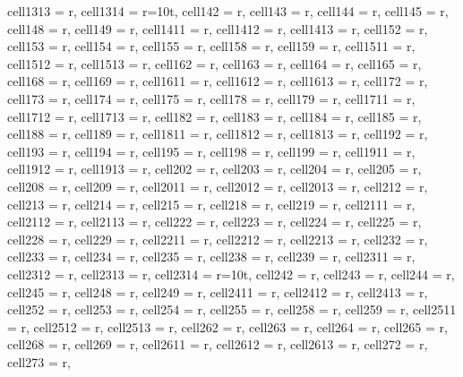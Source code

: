 \begin{landscape}
\begin{longtblr}[
  caption = {Changes in average values and effects differences significance from post hoc analysis.},
  label = {tab:appendix_LCBM_all_results_post_hocs}
]
{  cell{13}{13} = {r},
  cell{13}{14} = {r=10}{t},
  cell{14}{2} = {r},
  cell{14}{3} = {r},
  cell{14}{4} = {r},
  cell{14}{5} = {r},
  cell{14}{8} = {r},
  cell{14}{9} = {r},
  cell{14}{11} = {r},
  cell{14}{12} = {r},
  cell{14}{13} = {r},
  cell{15}{2} = {r},
  cell{15}{3} = {r},
  cell{15}{4} = {r},
  cell{15}{5} = {r},
  cell{15}{8} = {r},
  cell{15}{9} = {r},
  cell{15}{11} = {r},
  cell{15}{12} = {r},
  cell{15}{13} = {r},
  cell{16}{2} = {r},
  cell{16}{3} = {r},
  cell{16}{4} = {r},
  cell{16}{5} = {r},
  cell{16}{8} = {r},
  cell{16}{9} = {r},
  cell{16}{11} = {r},
  cell{16}{12} = {r},
  cell{16}{13} = {r},
  cell{17}{2} = {r},
  cell{17}{3} = {r},
  cell{17}{4} = {r},
  cell{17}{5} = {r},
  cell{17}{8} = {r},
  cell{17}{9} = {r},
  cell{17}{11} = {r},
  cell{17}{12} = {r},
  cell{17}{13} = {r},
  cell{18}{2} = {r},
  cell{18}{3} = {r},
  cell{18}{4} = {r},
  cell{18}{5} = {r},
  cell{18}{8} = {r},
  cell{18}{9} = {r},
  cell{18}{11} = {r},
  cell{18}{12} = {r},
  cell{18}{13} = {r},
  cell{19}{2} = {r},
  cell{19}{3} = {r},
  cell{19}{4} = {r},
  cell{19}{5} = {r},
  cell{19}{8} = {r},
  cell{19}{9} = {r},
  cell{19}{11} = {r},
  cell{19}{12} = {r},
  cell{19}{13} = {r},
  cell{20}{2} = {r},
  cell{20}{3} = {r},
  cell{20}{4} = {r},
  cell{20}{5} = {r},
  cell{20}{8} = {r},
  cell{20}{9} = {r},
  cell{20}{11} = {r},
  cell{20}{12} = {r},
  cell{20}{13} = {r},
  cell{21}{2} = {r},
  cell{21}{3} = {r},
  cell{21}{4} = {r},
  cell{21}{5} = {r},
  cell{21}{8} = {r},
  cell{21}{9} = {r},
  cell{21}{11} = {r},
  cell{21}{12} = {r},
  cell{21}{13} = {r},
  cell{22}{2} = {r},
  cell{22}{3} = {r},
  cell{22}{4} = {r},
  cell{22}{5} = {r},
  cell{22}{8} = {r},
  cell{22}{9} = {r},
  cell{22}{11} = {r},
  cell{22}{12} = {r},
  cell{22}{13} = {r},
  cell{23}{2} = {r},
  cell{23}{3} = {r},
  cell{23}{4} = {r},
  cell{23}{5} = {r},
  cell{23}{8} = {r},
  cell{23}{9} = {r},
  cell{23}{11} = {r},
  cell{23}{12} = {r},
  cell{23}{13} = {r},
  cell{23}{14} = {r=10}{t},
  cell{24}{2} = {r},
  cell{24}{3} = {r},
  cell{24}{4} = {r},
  cell{24}{5} = {r},
  cell{24}{8} = {r},
  cell{24}{9} = {r},
  cell{24}{11} = {r},
  cell{24}{12} = {r},
  cell{24}{13} = {r},
  cell{25}{2} = {r},
  cell{25}{3} = {r},
  cell{25}{4} = {r},
  cell{25}{5} = {r},
  cell{25}{8} = {r},
  cell{25}{9} = {r},
  cell{25}{11} = {r},
  cell{25}{12} = {r},
  cell{25}{13} = {r},
  cell{26}{2} = {r},
  cell{26}{3} = {r},
  cell{26}{4} = {r},
  cell{26}{5} = {r},
  cell{26}{8} = {r},
  cell{26}{9} = {r},
  cell{26}{11} = {r},
  cell{26}{12} = {r},
  cell{26}{13} = {r},
  cell{27}{2} = {r},
  cell{27}{3} = {r},
}
\end{longtblr}
\end{landscape}
